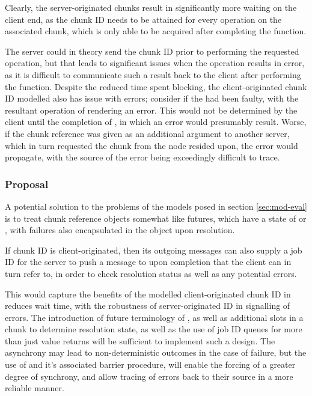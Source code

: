 Clearly, the server-originated chunks result in significantly more waiting on
the client end, as the chunk ID needs to be attained for every operation on the
associated chunk, which is only able to be acquired after completing the
function.

The server could in theory send the chunk ID prior to performing the requested
operation, but that leads to significant issues when the operation results in
error, as it is difficult to communicate such a result back to the client after
performing the function.
Despite the reduced time spent blocking, the client-originated chunk ID
modelled also has issue with errors; consider if the  had
been faulty, with the resultant operation of  rendering an error.
This would not be determined by the client until the completion of
, in which an error would presumably result.
Worse, if the chunk reference  was given as an additional argument to
another server, which in turn requested the chunk  from the node
 resided upon, the error would propagate, with the source of the
error being exceedingly difficult to trace.

\subsubsection{Proposal}

A potential solution to the problems of the models posed in section
\cref{sec:mod-eval} is to treat chunk reference objects somewhat like futures,
which have a state of  or , with failures
also encapsulated in the object upon resolution\cite{bengtsson20:future-r}.

If chunk ID is client-originated, then its outgoing messages can also supply a
job ID for the server to push a message to upon completion that the client can
in turn refer to, in order to check resolution status as well as any potential
errors.

This would capture the benefits of the modelled client-originated chunk ID in
reduces wait time, with the robustness of server-originated ID in signalling of
errors.
The introduction of future terminology of , as well as
additional slots in a chunk to determine resolution state, as well as the use
of job ID queues for more than just value returns will be sufficient to
implement such a design.
The asynchrony may lead to non-deterministic outcomes in the case of failure,
but the use of  and it's associated barrier procedure,
 will enable the forcing of a greater degree of synchrony,
and allow tracing of errors back to their source in a more reliable manner.

